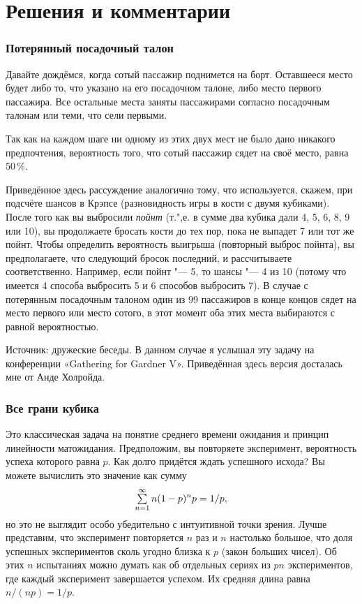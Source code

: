 \documentclass[twoside]{book}
\begin{document}

\section*{Решения и комментарии}

\subsubsection*{Потерянный посадочный талон}%

Давайте дождёмся, когда сотый пассажир поднимется на борт. 
Оставшееся место будет либо то, что указано на его посадочном талоне, либо место первого пассажира.
Все остальные места заняты пассажирами согласно посадочным талонам или теми, что сели первыми.

Так как на каждом шаге ни одному из этих двух мест не было дано никакого предпочтения, вероятность того, что сотый пассажир сядет на своё место, равна $50\,\%$.
\heart

Приведённое здесь рассуждение аналогично тому, что используется, скажем, при подсчёте шансов в Крэпсе (разновидность игры в кости с двумя кубиками).
После того как вы выбросили \emph{пойнт}
(т.",е. в сумме два кубика дали 4, 5, 6, 8, 9 или 10), вы продолжаете бросать кости до тех пор, пока не выпадет 7 или тот же пойнт.
Чтобы определить вероятность выигрыша (повторный выброс пойнта), вы предполагаете, что следующий бросок последний, и рассчитываете соответственно.
Например, если пойнт "--- 5, то шансы "--- 4 из 10 (потому что имеется 4 способа выбросить 5 и 6 способов выбросить 7).
В случае с потерянным посадочным талоном один из 99 пассажиров в конце концов сядет на место первого или место сотого, в этот момент оба этих места выбираются с равной вероятностью. 

\medskip

{\small

Источник: дружеские беседы.
В данном случае я услышал эту задачу на конференции «Gathering for Gardner V».
Приведённая здесь версия досталась мне от Анде Холройда. %

}
\subsubsection*{Все грани кубика}%

Это классическая задача на понятие среднего времени ожидания и принцип линейности матожидания.
Предположим, вы повторяете эксперимент, вероятность успеха которого равна $p$.
Как долго придётся ждать успешного исхода? Вы можете вычислить это значение как сумму
\[\mathop{\textstyle\sum}\limits_{n=1}^\infty n(1-p)^np=1/p,\]
но это не выглядит особо убедительно с интуитивной точки зрения.
Лучше представим, что эксперимент повторяется $n$ раз и $n$ настолько большое, что доля успешных экспериментов сколь угодно близка к $p$ (закон больших чисел).
Об этих $n$ испытаниях можно думать как об отдельных сериях из $pn$ экспериментов, где каждый эксперимент завершается успехом.
Их средняя длина равна $n/(np)=1/p$.
\end{document}
